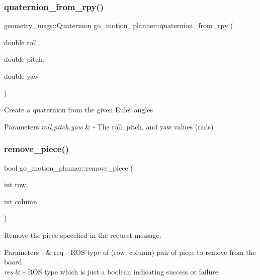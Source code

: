 \subsubsection{\texorpdfstring{quaternion\+\_\+from\+\_\+rpy()}{quaternion\_from\_rpy()}}
{\footnotesize\ttfamily geometry\+\_\+msgs\+::\+Quaternion go\+\_\+motion\+\_\+planner\+::quaternion\+\_\+from\+\_\+rpy (\begin{DoxyParamCaption}\item[{double}]{roll,  }\item[{double}]{pitch,  }\item[{double}]{yaw }\end{DoxyParamCaption})}




\begin{DoxyItemize}
\item Create a quaternion from the given Euler angles 
\end{DoxyItemize}


\begin{DoxyParams}{Parameters}
{\em roll,pitch,yaw} & -\/ The roll, pitch, and yaw values (rads) \\
\hline
\end{DoxyParams}
\mbox{\label{classgo__motion__planner_a29c727d02a06b13b39e907384c71eb1e}} 
\subsubsection{\texorpdfstring{remove\+\_\+piece()}{remove\_piece()}}
{\footnotesize\ttfamily bool go\+\_\+motion\+\_\+planner\+::remove\+\_\+piece (\begin{DoxyParamCaption}\item[{int}]{row,  }\item[{int}]{column }\end{DoxyParamCaption})}



Remove the piece specefied in the request message. 


\begin{DoxyParams}{Parameters}
{\em -\/} & req -\/ R\+OS type of (row, column) pair of piece to remove from the board \\
\hline
{\em res} & -\/ R\+OS type which is just a boolean indicating success or failure \\
\hline
\end{DoxyParams}
\mbox{\label{classgo__motion__planner_ab4b74ceb1ce2cab6859d8f7f0f32caa5}} 
